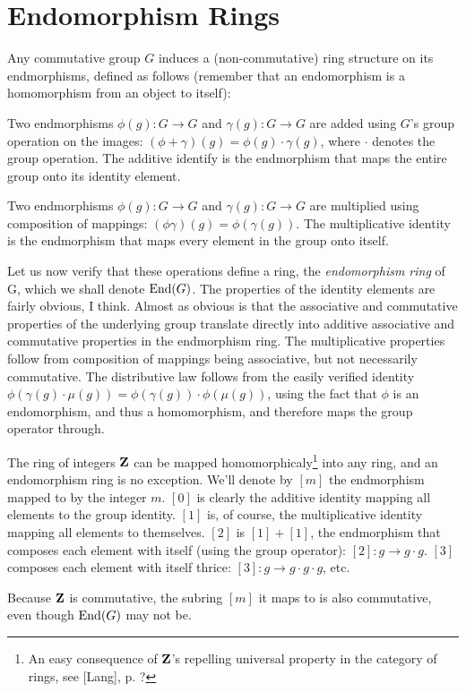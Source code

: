 \section{Endomorphism Rings}

Any commutative group $G$ induces a (non-commutative) ring structure
on its endmorphisms, defined as follows (remember that an
endomorphism is a homomorphism from an object to itself):

Two endmorphisms $\phi(g): G \to G$ and $\gamma(g): G \to G$ are added
using $G$'s group operation on the images: $(\phi+\gamma)(g) =
\phi(g)\cdot\gamma(g)$, where $\cdot$ denotes the group operation.
The additive identify is the endmorphism that maps the entire group
onto its identity element.

Two endmorphisms $\phi(g): G \to G$ and $\gamma(g): G \to G$ are
multiplied using composition of mappings: $(\phi\gamma)(g) =
\phi(\gamma(g))$.  The multiplicative identity is the endmorphism that
maps every element in the group onto itself.

Let us now verify that these operations define a ring, the {\it endomorphism
ring} of G, which we shall denote ${\rm End}(G)$.  The properties
of the identity elements are fairly obvious, I think.  Almost as
obvious is that the associative and commutative properties of the
underlying group translate directly into additive associative and
commutative properties in the endmorphism ring.  The multiplicative
properties follow from composition of mappings being associative, but
not necessarily commutative.  The distributive law follows from the
easily verified identity $\phi(\gamma(g)\cdot\mu(g)) = \phi(\gamma(g)) \cdot
\phi(\mu(g))$, using the fact that $\phi$ is an endomorphism, and thus
a homomorphism, and therefore maps the group operator through.

The ring of integers ${\bf Z}$ can be mapped homomorphicaly\footnote{An easy
consequence of ${\bf Z}$'s repelling universal property in the category of
rings, see [Lang], p. ?} into any ring, and an endomorphism ring is no
exception.  We'll denote by $[m]$ the endmorphism mapped to by the
integer $m$. $[0]$ is clearly the additive identity mapping all
elements to the group identity.  $[1]$ is, of course, the
multiplicative identity mapping all elements to themselves.  $[2]$ is
$[1]+[1]$, the endmorphism that composes each element with itself
(using the group operator): $[2]: g \to g\cdot g$.  $[3]$ composes
each element with itself thrice: $[3]: g \to g\cdot g\cdot g$, etc.

Because ${\bf Z}$ is commutative, the subring $[m]$ it maps to is also
commutative, even though ${\rm End}(G)$ may not be.
